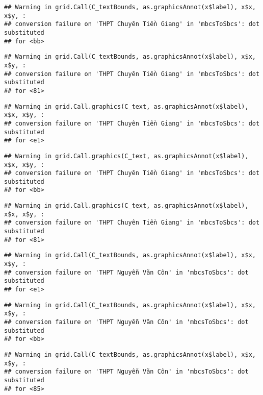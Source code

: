 \documentclass[
]{article}
\begin{document}
\begin{verbatim}
## Warning in grid.Call(C_textBounds, as.graphicsAnnot(x$label), x$x, x$y, :
## conversion failure on 'THPT Chuyên Tiền Giang' in 'mbcsToSbcs': dot substituted
## for <bb>
\end{verbatim}

\begin{verbatim}
## Warning in grid.Call(C_textBounds, as.graphicsAnnot(x$label), x$x, x$y, :
## conversion failure on 'THPT Chuyên Tiền Giang' in 'mbcsToSbcs': dot substituted
## for <81>
\end{verbatim}

\begin{verbatim}
## Warning in grid.Call.graphics(C_text, as.graphicsAnnot(x$label), x$x, x$y, :
## conversion failure on 'THPT Chuyên Tiền Giang' in 'mbcsToSbcs': dot substituted
## for <e1>
\end{verbatim}

\begin{verbatim}
## Warning in grid.Call.graphics(C_text, as.graphicsAnnot(x$label), x$x, x$y, :
## conversion failure on 'THPT Chuyên Tiền Giang' in 'mbcsToSbcs': dot substituted
## for <bb>
\end{verbatim}

\begin{verbatim}
## Warning in grid.Call.graphics(C_text, as.graphicsAnnot(x$label), x$x, x$y, :
## conversion failure on 'THPT Chuyên Tiền Giang' in 'mbcsToSbcs': dot substituted
## for <81>
\end{verbatim}

\begin{verbatim}
## Warning in grid.Call(C_textBounds, as.graphicsAnnot(x$label), x$x, x$y, :
## conversion failure on 'THPT Nguyễn Văn Côn' in 'mbcsToSbcs': dot substituted
## for <e1>
\end{verbatim}

\begin{verbatim}
## Warning in grid.Call(C_textBounds, as.graphicsAnnot(x$label), x$x, x$y, :
## conversion failure on 'THPT Nguyễn Văn Côn' in 'mbcsToSbcs': dot substituted
## for <bb>
\end{verbatim}

\begin{verbatim}
## Warning in grid.Call(C_textBounds, as.graphicsAnnot(x$label), x$x, x$y, :
## conversion failure on 'THPT Nguyễn Văn Côn' in 'mbcsToSbcs': dot substituted
## for <85>
\end{verbatim}
\end{document}
